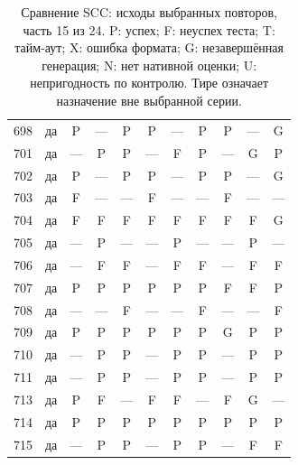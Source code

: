 \begin{table}[p]
\begin{tabular*}{\textwidth}{@{\extracolsep{\fill}}rc*{9}{c}@{}}
698 & да & P & — & P & P & — & P & P & — & G\\
701 & да & — & P & P & — & F & P & — & G & P\\
702 & да & P & — & P & P & — & P & P & — & G\\
703 & да & F & — & — & F & — & — & F & — & —\\
704 & да & F & F & F & F & F & F & F & F & G\\
705 & да & — & P & — & — & P & — & — & P & —\\
706 & да & — & F & F & — & F & F & — & F & F\\
707 & да & P & P & P & P & P & P & F & F & P\\
708 & да & — & — & F & — & — & F & — & — & F\\
709 & да & P & P & P & P & P & P & G & P & P\\
710 & да & — & P & P & — & P & P & — & P & P\\
711 & да & — & P & P & — & P & P & — & P & P\\
713 & да & P & F & — & F & F & — & F & G & —\\
714 & да & P & P & P & P & P & P & P & P & P\\
715 & да & — & P & P & — & P & P & — & F & F\\
\bottomrule\end{tabular*}
\caption{Сравнение SCC: исходы выбранных повторов, часть 15 из 24. P: успех; F: неуспех теста; T: тайм-аут; X: ошибка формата; G: незавершённая генерация; N: нет нативной оценки; U: непригодность по контролю. Тире означает назначение вне выбранной серии.}
\end{table}
\clearpage
